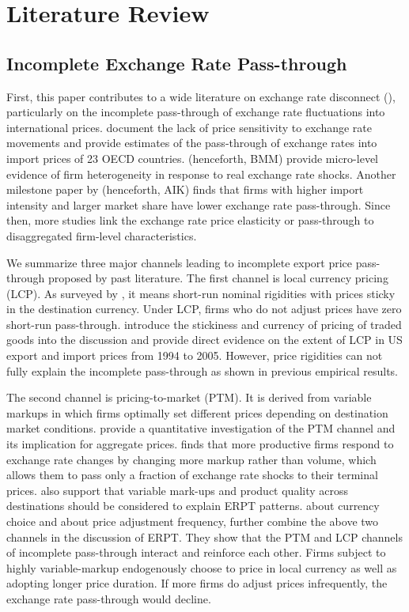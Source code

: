 \chapter{Literature Review} \label{sec-2.literature}

\section{Incomplete Exchange Rate Pass-through}

First, this paper contributes to a wide literature on exchange rate disconnect (\cite{obstfeld2000}),  particularly on the incomplete pass-through of exchange rate fluctuations into international prices. \cite{campa2005} document the lack of price sensitivity to exchange rate movements and provide estimates of the pass-through of exchange rates into import prices of 23 OECD countries. \cite{bmm2012} (henceforth, BMM) provide micro-level evidence of firm heterogeneity in response to real exchange rate shocks. Another milestone paper by \cite{aik2014} (henceforth, AIK) finds that firms with higher import intensity and larger market share have lower exchange rate pass-through. Since then, more studies link the exchange rate price elasticity or pass-through to disaggregated firm-level characteristics.

We summarize three major channels leading to incomplete export price pass-through proposed by past literature. The first channel is local currency pricing (LCP). As surveyed by \cite{engel2002}, it means short-run nominal rigidities with prices sticky in the destination currency. Under LCP, firms who do not adjust prices have zero short-run pass-through. \cite{gopinath2008} introduce the stickiness and currency of pricing of traded goods into the discussion and provide direct evidence on the extent of LCP in US export and import prices from 1994 to 2005.  However, price rigidities can not fully explain the incomplete pass-through as shown in previous empirical results.

The second channel is pricing-to-market (PTM). It is derived from variable markups in which firms optimally set different prices depending on destination market conditions. \cite{atkeson2008} provide a quantitative investigation of the PTM channel and its implication for aggregate prices. \cite{bmm2012} finds that more productive firms respond to exchange rate changes by changing more markup rather than volume, which allows them to pass only a fraction of exchange rate shocks to their terminal prices. \cite{manova-zhang2012} also support that variable mark-ups and product quality across destinations should be considered to explain ERPT patterns. \cite{gopinath2010-currency} about currency choice and \cite{gopinath2010-frequency} about price adjustment frequency, further combine the above two channels in the discussion of ERPT. They show that the PTM and LCP channels of incomplete pass-through interact and reinforce each other. Firms subject to highly variable-markup endogenously choose to price in local currency as well as adopting longer price duration. If more firms do adjust prices infrequently, the exchange rate pass-through would decline.

